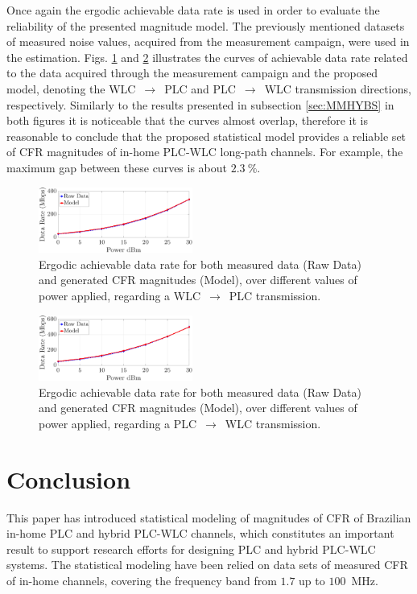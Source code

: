 \documentclass[journal]{IEEEtran}
\begin{document}
Once again the ergodic achievable data rate is used in order to evaluate the reliability of the presented magnitude model. The previously mentioned datasets of measured noise values, acquired from the measurement campaign, were used in the estimation. Figs. \ref{Cap_LP_PLC} and \ref{Cap_LP_WLC} illustrates the curves of achievable data rate related to the data acquired through the measurement campaign and the proposed model, denoting the \ac{WLC}~$\rightarrow$~\ac{PLC} and \ac{PLC}~$\rightarrow$~\ac{WLC} transmission directions, respectively. Similarly to the results presented in subsection \ref{sec:MMHYBS} in both figures it is noticeable that the curves almost overlap, therefore it is reasonable to conclude that the proposed statistical model provides a reliable set of \ac{CFR} magnitudes of in-home \ac{PLC}-\ac{WLC} long-path channels. For example, the maximum gap between these curves is about $2.3~\%$.

\begin{figure}[h]
	\centering
	\includegraphics[width=0.45\textwidth]{images/Capacidade_LP_PLCnoise.eps}
	\caption{Ergodic achievable data rate for both measured data (Raw Data) and generated CFR magnitudes (Model), over different values of power applied, regarding a WLC~$\rightarrow$~PLC transmission.}
	\label{Cap_LP_PLC}
\end{figure}

\begin{figure}[h]
	\centering
	\includegraphics[width=0.45\textwidth]{images/Capacidade_LP_WLCnoise.eps}
	\caption{Ergodic achievable data rate for both measured data (Raw Data) and generated CFR magnitudes (Model), over different values of power applied, regarding a PLC~$\rightarrow$~WLC transmission.}
	\label{Cap_LP_WLC}
\end{figure}

\section{Conclusion}
This paper has introduced statistical modeling of magnitudes of \ac{CFR} of Brazilian in-home \ac{PLC} and hybrid \ac{PLC}-\ac{WLC} channels, which constitutes an important result to support research efforts for designing \ac{PLC} and hybrid \ac{PLC}-\ac{WLC} systems. The statistical modeling have been relied on data sets of measured \ac{CFR} of in-home channels, covering the frequency band from $1.7$ up to $100$~MHz. 
\end{document}

